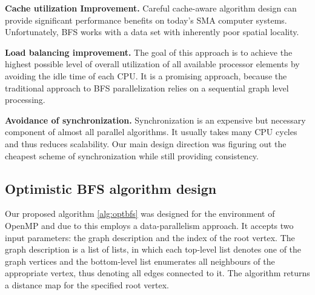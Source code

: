 \documentclass[letterpaper]{article}
\begin{document}
			\textbf{Cache utilization Improvement.}
			Careful cache-aware algorithm design can provide significant performance benefits on today's SMA computer systems.
			Unfortunately, BFS works with a data set with inherently poor spatial locality. 
			
			\textbf{Load balancing improvement.} 
			The goal of this approach is to achieve the highest possible level of overall utilization of all available processor elements by avoiding the idle time of each CPU.
			It is a promising approach, because the traditional approach to BFS parallelization relies on a sequential graph level processing.
						
			\textbf{Avoidance of synchronization.}
			Synchronization is an expensive but necessary component of almost all parallel algorithms.
			It usually takes many CPU cycles and thus reduces scalability.
			Our main design direction was figuring out the cheapest scheme of synchronization while still providing consistency.
			
			
		\subsection{Optimistic BFS algorithm design}
			Our proposed algorithm \ref{alg:optbfs} was designed for the environment of OpenMP and due to this employs a data-parallelism approach. 
			It accepts two input parameters: the graph description and the index of the root vertex.
			The graph description is a list of lists, in which each top-level list denotes one of the graph vertices and the bottom-level list enumerates all neighbours of the appropriate vertex, thus denoting all edges connected to it.
			The algorithm returns a distance map for the specified root vertex.
			
\end{document}
